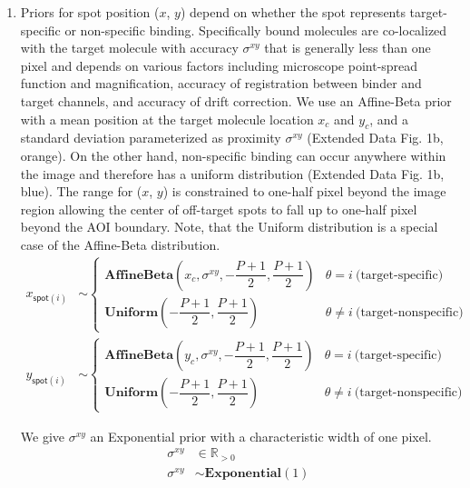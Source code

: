 \begin{enumerate}
\item Priors for spot position ($x$, $y$) depend on whether the spot represents target-specific or non-specific binding. Specifically bound molecules are co-localized with the target molecule with accuracy $\sigma^{xy}$ that is generally less than one pixel and depends on various factors including microscope point-spread function and magnification, accuracy of registration between binder and target channels, and accuracy of drift correction. We use an Affine-Beta prior with a mean position at the target molecule location $x_c$ and $y_c$, and a standard deviation parameterized as proximity $\sigma^{xy}$ (Extended Data Fig. 1b, orange). On the other hand, non-specific binding can occur anywhere within the image and therefore has a uniform distribution (Extended Data Fig. 1b, blue).  The range for ($x$, $y$) is constrained to one-half pixel beyond the image region allowing the center of off-target spots to fall up to one-half pixel beyond the AOI boundary. Note, that the Uniform distribution is a special case of the Affine-Beta distribution.
%
\begin{subequations}
\begin{align}
    x_{\mathsf{spot}(i)} &\sim
    \begin{cases}
        \mathbf{AffineBeta}\left( x_c, \sigma^{xy}, -\dfrac{P+1}{2}, \dfrac{P+1}{2} \right) & \theta = i ~\textrm{(target-specific)} \\
        \mathbf{Uniform}\left(-\dfrac{P+1}{2}, \dfrac{P+1}{2} \right) & \theta \neq i ~\text{(target-nonspecific)}
    \end{cases} \\
    y_{\mathsf{spot}(i)} &\sim
    \begin{cases}
        \mathbf{AffineBeta}\left( y_c, \sigma^{xy}, -\dfrac{P+1}{2}, \dfrac{P+1}{2} \right) & \theta = i ~\textrm{(target-specific)} \\
        \mathbf{Uniform}\left(-\dfrac{P+1}{2}, \dfrac{P+1}{2} \right) & \theta \neq i ~\text{(target-nonspecific)}
    \end{cases}
\end{align}
\end{subequations}

We give $\sigma^{xy}$ an Exponential prior with a characteristic width of one pixel.
%
\begin{subequations}
\begin{align}
    \sigma^{xy} &\in \mathbb{R}_{>0} \\
    \sigma^{xy} &\sim \mathbf{Exponential}(1)
\end{align}
\end{subequations}


\end{enumerate}
